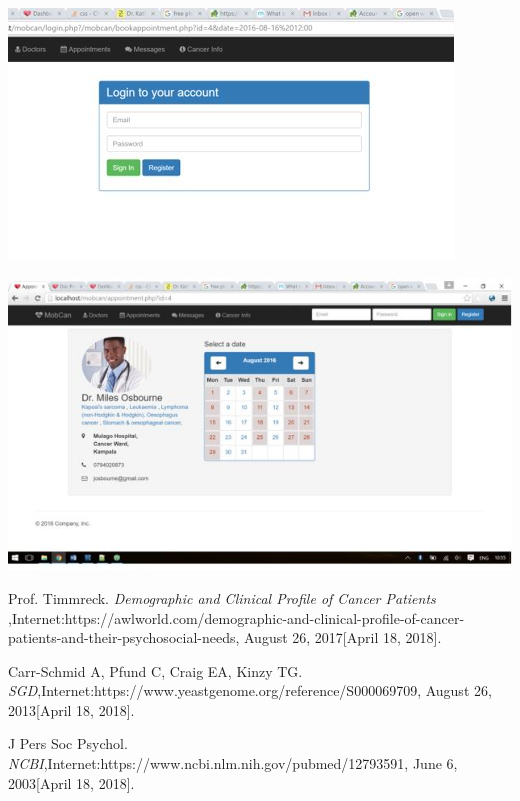 \documentclass[12pt]{article}
\begin{document}
\begin{center}
\includegraphics[scale=0.8]{loggin}
\end{center}

\begin{center}
\includegraphics[scale=0.8]{appointment}
\end{center}


\begin{thebibliography}{9}

 Prof. Timmreck. \textit{Demographic and Clinical Profile of Cancer Patients },Internet:https://awlworld.com/demographic-and-clinical-profile-of-cancer-patients-and-their-psychosocial-needs, August 26, 2017[April 18, 2018].


Carr-Schmid A, Pfund C, Craig EA, Kinzy TG. \textit{SGD},Internet:https://www.yeastgenome.org/reference/S000069709, August 26, 2013[April 18, 2018].

J Pers Soc Psychol. \textit{NCBI},Internet:https://www.ncbi.nlm.nih.gov/pubmed/12793591, June 6, 2003[April 18, 2018].



\end{thebibliography}
\end{document}
